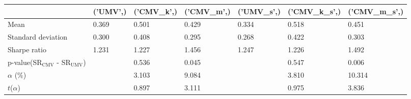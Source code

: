 \begin{tabular}{lllllll}
\toprule
 & ('UMV',) & ('CMV_k',) & ('CMV_m',) & ('UMV_s',) & ('CMV_k_s',) & ('CMV_m_s',) \\
\midrule
Mean & 0.369 & 0.501 & 0.429 & 0.334 & 0.518 & 0.451 \\
Standard deviation & 0.300 & 0.408 & 0.295 & 0.268 & 0.422 & 0.303 \\
Sharpe ratio & 1.231 & 1.227 & 1.456 & 1.247 & 1.226 & 1.492 \\
p-value(SR$_{\text{CMV}}$ - SR$_{\text{UMV}}$) &  & 0.536 & 0.045 &  & 0.547 & 0.006 \\
$\alpha$ (\%) &  & 3.103 & 9.084 &  & 3.810 & 10.314 \\
$t$($\alpha$) &  & 0.897 & 3.111 &  & 0.975 & 3.836 \\
\bottomrule
\end{tabular}
